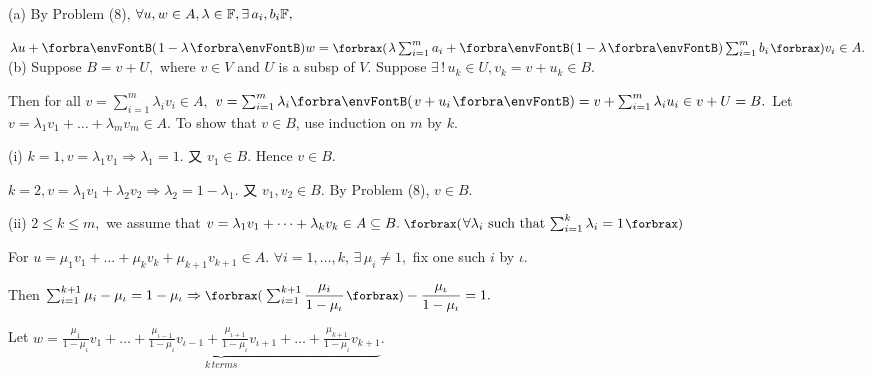 \documentclass[a4paper, 11pt, UTF8]{article}
\begin{document}
\begin{large}
\par\quad
(a) By Problem (8), $\forall u, w\in A,\lambda\in{\mathbb{F}},\exists\,a_i,b_i{\mathbb{F}},$\par\quad\Ha
$\lambda u+\Par{1-\lambda}w=\XPar{\lambda\sum_{i=1}^m a_i+\Par{1-\lambda}\sum_{i=1}^m b_i}v_i\in A.$\PfEnd\vspace{8pt}\quad
(b) Suppose $B=v+U,$ where $v\in V$ and $U$ is a subsp of $V.$ Suppose $\exists\,!\,u_k\in U,v_k=v+u_k\in B.$\par\quad\Hb
Then for all $v=\sum_{i=1}^m \lambda_i v_i\in A,$ $v=\sum_{i=1}^m \lambda_i\Par{v+u_i}=v+\sum_{i=1}^m \lambda_i u_i\in v+U=B.$\PfEnd\vspace{10pt}\quad\Hb 
\Or \vspace{2pt}Let $v=\lambda_1 v_1+\dots+\lambda_m v_m\in A$. To show that $v\in B$, use induction on $m$ by $k$.\par\quad\Hb
(i) \vspace{2pt}$k=1,v=\lambda_1 v_1\Rightarrow \lambda_1=1.$ 又 $v_1\in B.$ Hence $v\in B$.\par\quad\Hb\Hi
\vspace{6pt}$k=2,v=\lambda_1 v_1+\lambda_2 v_2\Rightarrow\lambda_2=1-\lambda_1.$ 又 $v_1,v_2\in B.$ By Problem (8), $v\in B$.\par\quad\Hb\Endi
(ii) \vspace{6pt}$2\leqslant k\leqslant m,$ we assume that $v=\lambda_1 v_1+\dots+\lambda_k v_k\in A\subseteq B.\;\XPar{\forall\lambda_i$ such that $\sum_{i=1}^k\lambda_i=1}$\par\quad\Hb\Hii
\vspace{6pt}For $u=\mu_1 v_1+\dots+\mu_k v_k+\mu_{k+1} v_{k+1}\in A.\,\,\forall i=1,\dots,k,\,\exists\,\mu_i\neq 1,$ fix one such $i$ by $\iota$.\par\quad\Hb\Hii
\vspace{6pt}Then $\sum_{i=1}^{k+1}\mu_i-\mu_\iota=1-\mu_\iota\Rightarrow\XPar{\sum_{i=1}^{k+1}\displaystyle\frac{\mu_i}{1-\mu_\iota}}-\displaystyle\frac{\mu_\iota}{1-\mu_\iota}=1.$\par\quad\Hb\Hii
\vspace{6pt}Let $w=\underbrace{\displaystyle\frac{\mu_1}{1-\mu_\iota}v_1+\dots+\displaystyle\frac{\mu_{\iota-1}}{1-\mu_\iota}v_{\iota-1}+\displaystyle\frac{\mu_{\iota+1}}{1-\mu_\iota}v_{\iota+1}+\dots+\displaystyle\frac{\mu_{k+1}}{1-\mu_\iota}v_{k+1}}_{k\,terms}.$\par\quad\Hb\Hii

\end{large}
\end{document}
